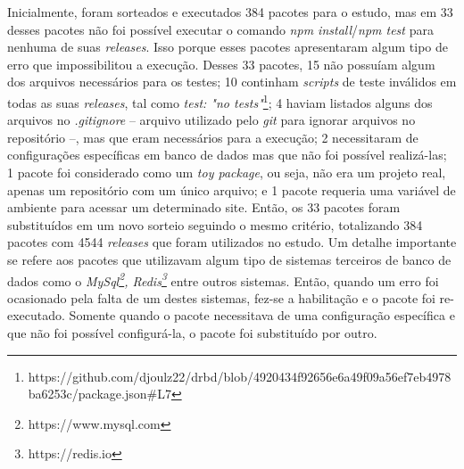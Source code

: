 Inicialmente, foram sorteados e executados 384 pacotes para o estudo, mas em 33 desses pacotes não foi possível executar o comando \textit{npm install}/\textit{npm test} para nenhuma de suas \textit{releases}. Isso porque esses pacotes apresentaram algum tipo de erro que impossibilitou a execução. Desses 33 pacotes, 15 não possuíam algum dos arquivos necessários para os testes; 10 continham \textit{scripts} de teste inválidos em todas as suas \textit{releases}, tal como \textit{test: "no tests"}\footnote{https://github.com/djoulz22/drbd/blob/4920434f92656e6a49f09a56ef7eb4978ba6253c/package.json\#L7}; 4 haviam listados alguns dos arquivos no \textit{.gitignore} -- arquivo utilizado pelo \textit{git} para ignorar arquivos no repositório --, mas que eram necessários para a execução; 2 necessitaram de configurações específicas em banco de dados mas que não foi possível realizá-las; 1 pacote foi considerado como um \textit{toy package}, ou seja, não era um projeto real, apenas um repositório com um único arquivo; e 1 pacote requeria uma variável de ambiente para acessar um determinado site. Então, os 33 pacotes foram substituídos em um novo sorteio seguindo o mesmo critério, totalizando 384 pacotes com 4544 \textit{releases} que foram utilizados no estudo. Um detalhe importante se refere aos pacotes que utilizavam algum tipo de sistemas terceiros de banco de dados como o \textit{MySql\footnote{https://www.mysql.com}, Redis\footnote{https://redis.io}} entre outros sistemas. Então, quando um erro foi ocasionado pela falta de um destes sistemas, fez-se a habilitação e o pacote foi re-executado. Somente quando o pacote necessitava de uma configuração específica e que não foi possível configurá-la, o pacote foi substituído por outro.

